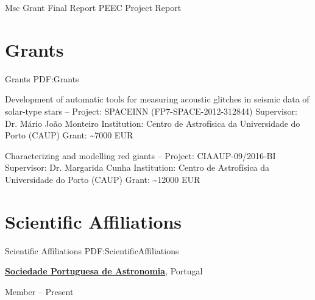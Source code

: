 \documentclass[letterpaper,10pt,oneside]{article}
\begin{document}
\begin{body}
Msc Grant Final Report
PEEC Project Report




\section
{Grants}
{Grants}
{PDF:Grants}

Development of automatic tools for measuring acoustic glitches in seismic data of solar-type stars
\hfill
{} --
\BulletItem
Project: SPACEINN (FP7-SPACE-2012-312844)
\BulletItem
Supervisor: Dr. Mário João Monteiro
\BulletItem
Institution: Centro de Astrofísica da Universidade do Porto (CAUP)
\BulletItem
Grant: \textasciitilde 7000 EUR


\BigGap
​Characterizing and modelling red giants
\hfill
{} --
\BulletItem
Project: ​CIAAUP-09/2016-BI
\BulletItem
Supervisor: Dr. Margarida Cunha
\BulletItem
Institution: Centro de Astrofísica da Universidade do Porto (CAUP)
\BulletItem
Grant: \textasciitilde 12000 EUR



\section
{Scientific Affiliations}
{Scientific Affiliations}
{PDF:ScientificAffiliations}

\href{http://www.sp-astronomia.pt/}
{\textbf{Sociedade Portuguesa de Astronomia}},
Portugal

\GapNoBreak
\BulletItem
Member
\hfill
{} --
Present


\end{body}
\end{document}
